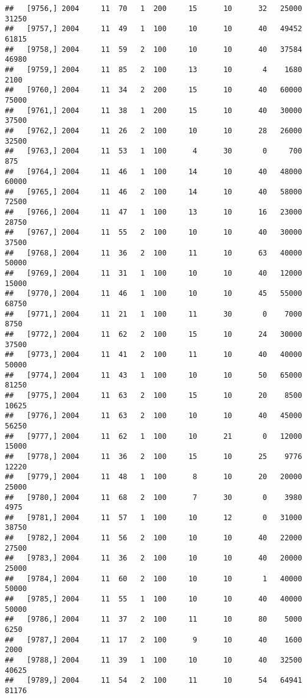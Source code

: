 \documentclass{article}\usepackage[]{graphicx}\usepackage[]{color}
\makeatletter
\newenvironment{kframe}{%
 \def\at@end@of@kframe{}%
 \ifinner\ifhmode%
  \def\at@end@of@kframe{\end{minipage}}%
  \begin{minipage}{\columnwidth}%
 \fi\fi%
 \def\FrameCommand##1{\hskip\@totalleftmargin \hskip-\fboxsep
 \colorbox{shadecolor}{##1}\hskip-\fboxsep
     \hskip-\linewidth \hskip-\@totalleftmargin \hskip\columnwidth}%
 \MakeFramed {\advance\hsize-\width
   \@totalleftmargin\z@ \linewidth\hsize
   \@setminipage}}%
 {\par\unskip\endMakeFramed%
 \at@end@of@kframe}
\newenvironment{knitrout}{}{} %
\makeatother
\begin{document}
\begin{knitrout}
\begin{kframe}
\begin{verbatim}
##   [9756,] 2004     11  70   1  200     15      10      32   25000   31250
##   [9757,] 2004     11  49   1  100     10      10      40   49452   61815
##   [9758,] 2004     11  59   2  100     10      10      40   37584   46980
##   [9759,] 2004     11  85   2  100     13      10       4    1680    2100
##   [9760,] 2004     11  34   2  200     15      10      40   60000   75000
##   [9761,] 2004     11  38   1  200     15      10      40   30000   37500
##   [9762,] 2004     11  26   2  100     10      10      28   26000   32500
##   [9763,] 2004     11  53   1  100      4      30       0     700     875
##   [9764,] 2004     11  46   1  100     14      10      40   48000   60000
##   [9765,] 2004     11  46   2  100     14      10      40   58000   72500
##   [9766,] 2004     11  47   1  100     13      10      16   23000   28750
##   [9767,] 2004     11  55   2  100     10      10      40   30000   37500
##   [9768,] 2004     11  36   2  100     11      10      63   40000   50000
##   [9769,] 2004     11  31   1  100     10      10      40   12000   15000
##   [9770,] 2004     11  46   1  100     10      10      45   55000   68750
##   [9771,] 2004     11  21   1  100     11      30       0    7000    8750
##   [9772,] 2004     11  62   2  100     15      10      24   30000   37500
##   [9773,] 2004     11  41   2  100     11      10      40   40000   50000
##   [9774,] 2004     11  43   1  100     10      10      50   65000   81250
##   [9775,] 2004     11  63   2  100     15      10      20    8500   10625
##   [9776,] 2004     11  63   2  100     10      10      40   45000   56250
##   [9777,] 2004     11  62   1  100     10      21       0   12000   15000
##   [9778,] 2004     11  36   2  100     15      10      25    9776   12220
##   [9779,] 2004     11  48   1  100      8      10      20   20000   25000
##   [9780,] 2004     11  68   2  100      7      30       0    3980    4975
##   [9781,] 2004     11  57   1  100     10      12       0   31000   38750
##   [9782,] 2004     11  56   2  100     10      10      40   22000   27500
##   [9783,] 2004     11  36   2  100     10      10      40   20000   25000
##   [9784,] 2004     11  60   2  100     10      10       1   40000   50000
##   [9785,] 2004     11  55   1  100     10      10      40   40000   50000
##   [9786,] 2004     11  37   2  100     11      10      80    5000    6250
##   [9787,] 2004     11  17   2  100      9      10      40    1600    2000
##   [9788,] 2004     11  39   1  100     10      10      40   32500   40625
##   [9789,] 2004     11  54   2  100     11      10      54   64941   81176

\end{verbatim}
\end{kframe}
\end{knitrout}
\end{document}
